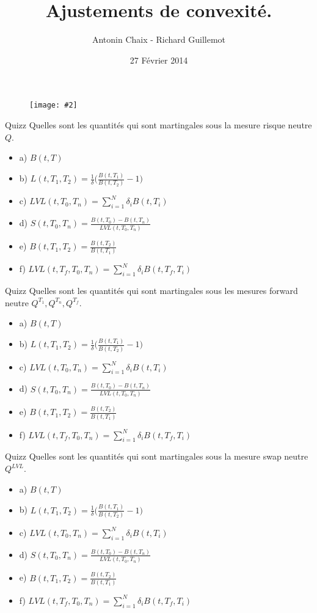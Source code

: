 \documentclass{beamer}
\title[Produits dérivés de taux]{Ajustements de convexité. }
\author{Antonin Chaix - Richard Guillemot}
\institute{Master IFMA}
\date{27 Février 2014}
\newcommand{\FIG}[2]{\texttt{[image: \#2]}}
\begin{document}
\begin{frame}
\titlepage
\begin{figure}[h]
\centering \FIG{5cm}{figures/UPMC_IFMA.jpg}
\end{figure}
\end{frame}

\begin{frame}{Quizz}
Quelles sont les quantités qui sont martingales sous la mesure risque neutre $Q$.
\begin{itemize}
\item a) $B(t,T)$
\item b) $L(t,T_1,T_2)=\frac{1}{\delta}\big(\frac{B(t,T_1)}{B(t,T_2)}-1 \big)$
\item c) $\displaystyle LVL(t,T_0,T_n)=\sum_{i=1}^{N}\delta_i B(t,T_i)$
\item d) $S(t,T_0,T_n)=\frac{B(t,T_0)-B(t,T_n)}{LVL(t,T_0,T_n)}$
\item e) $B(t,T_1,T_2)=\frac{B(t,T_2)}{B(t,T_1)}$ 
\item f) $\displaystyle LVL(t,T_f,T_0,T_n)=\sum_{i=1}^{N}\delta_i B(t,T_f,T_i)$
\end{itemize}
\end{frame}


\begin{frame}{Quizz}
Quelles sont les quantités qui sont martingales sous les mesures forward neutre $Q^{T_1}, Q^{T_n}, Q^{T_f}$.
\begin{itemize}
\item a) $B(t,T)$
\item b) $L(t,T_1,T_2)=\frac{1}{\delta}\big(\frac{B(t,T_1)}{B(t,T_2)}-1 \big)$
\item c) $\displaystyle LVL(t,T_0,T_n)=\sum_{i=1}^{N}\delta_i B(t,T_i)$
\item d) $S(t,T_0,T_n)=\frac{B(t,T_0)-B(t,T_n)}{LVL(t,T_0,T_n)}$
\item e) $B(t,T_1,T_2)=\frac{B(t,T_2)}{B(t,T_1)}$ 
\item f) $\displaystyle LVL(t,T_f,T_0,T_n)=\sum_{i=1}^{N}\delta_i B(t,T_f,T_i)$
\end{itemize}
\end{frame}

\begin{frame}{Quizz}
Quelles sont les quantités qui sont martingales sous la mesure swap neutre $Q^{LVL}$.
\begin{itemize}
\item a) $B(t,T)$
\item b) $L(t,T_1,T_2)=\frac{1}{\delta}\big(\frac{B(t,T_1)}{B(t,T_2)}-1 \big)$
\item c) $\displaystyle LVL(t,T_0,T_n)=\sum_{i=1}^{N}\delta_i B(t,T_i)$
\item d) $S(t,T_0,T_n)=\frac{B(t,T_0)-B(t,T_n)}{LVL(t,T_0,T_n)}$
\item e) $B(t,T_1,T_2)=\frac{B(t,T_2)}{B(t,T_1)}$ 
\item f) $\displaystyle LVL(t,T_f,T_0,T_n)=\sum_{i=1}^{N}\delta_i B(t,T_f,T_i)$
\end{itemize}
\end{frame}
\end{document}
